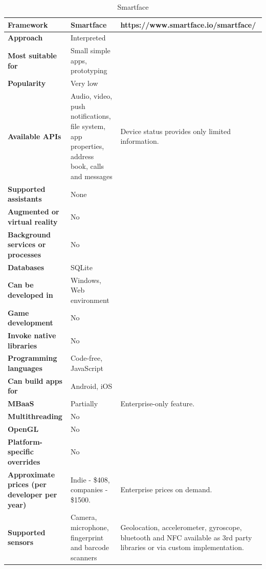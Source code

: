 \documentclass[english,master,public,dept460,male,cpdeclaration,oneside]{diploma}
\begin{document}
\begin{table}[!h]
	\centering
	\caption{Smartface}
	\begin{tabular}{p{} | p{} | p{}}
		\toprule		
		\textbf{Framework} & \textbf{Smartface} & https://www.smartface.io/smartface/ \\
		\midrule
		\textbf{Approach} & Interpreted & \\			
		\midrule	
		\textbf{Most suitable for} & Small simple apps, prototyping & \\
		\midrule
		\textbf{Popularity} & Very low & \\			
		\midrule
		\textbf{Available APIs} & Audio, video, push notifications, file system, app properties, address book, calls and messages & Device status provides only limited information. \\			
		\midrule
		\textbf{Supported assistants} & None & \\			
		\midrule
		\textbf{Augmented or virtual reality} & No & \\			
		\midrule
		\textbf{Background services or processes} & No & \\			
		\midrule
		\textbf{Databases} & SQLite & \\			
		\midrule
		\textbf{Can be developed in} & Windows, Web environment &  \\			
		\midrule
		\textbf{Game development} & No & \\			
		\midrule
		\textbf{Invoke native libraries} & No & \\			
		\midrule
		\textbf{Programming languages} & Code-free, JavaScript & \\			
		\midrule
		\textbf{Can build apps for} & Android, iOS & \\			
		\midrule
		\textbf{MBaaS} & Partially & Enterprise-only feature. \\			
		\midrule
		\textbf{Multithreading} & No & \\			
		\midrule
		\textbf{OpenGL} & No & \\			
		\midrule
		\textbf{Platform-specific overrides} & No & \\			
		\midrule
		\textbf{Approximate prices (per developer per year)} & Indie - \$408, companies - \$1500. & Enterprise prices on demand. \\			
		\midrule
		\textbf{Supported sensors} & Camera, microphone, fingerprint and barcode scanners & Geolocation, accelerometer, gyroscope, bluetooth and NFC available as 3rd party libraries or via custom implementation. \\			
		\midrule
	\end{tabular}
\end{table}
\end{document}
